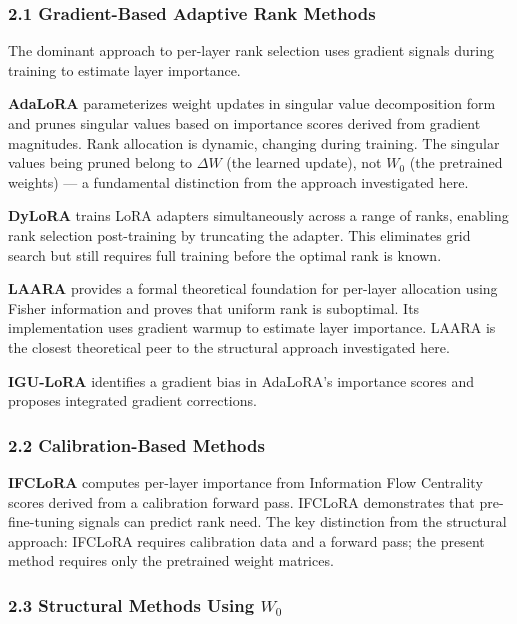 
\subsubsection{2.1 Gradient-Based Adaptive Rank Methods}

The dominant approach to per-layer rank selection uses gradient signals during training to estimate layer importance.

\textbf{AdaLoRA} \citep{Zhang2023AdaLoRA} parameterizes weight updates in singular value decomposition form and prunes singular values based on importance scores derived from gradient magnitudes. Rank allocation is dynamic, changing during training. The singular values being pruned belong to $\Delta W$ (the learned update), not $W_0$ (the pretrained weights) --- a fundamental distinction from the approach investigated here.

\textbf{DyLoRA} \citep{Valipour2022} trains LoRA adapters simultaneously across a range of ranks, enabling rank selection post-training by truncating the adapter. This eliminates grid search but still requires full training before the optimal rank is known.

\textbf{LAARA} \citep{Tripathi2026LAARA} provides a formal theoretical foundation for per-layer allocation using Fisher information and proves that uniform rank is suboptimal. Its implementation uses gradient warmup to estimate layer importance. LAARA is the closest theoretical peer to the structural approach investigated here.

\textbf{IGU-LoRA} \citep{Jiang2026IGULoRA} identifies a gradient bias in AdaLoRA's importance scores and proposes integrated gradient corrections.

\subsubsection{2.2 Calibration-Based Methods}

\textbf{IFCLoRA} \citep{Zhang2026IFCLoRA} computes per-layer importance from Information Flow Centrality scores derived from a calibration forward pass. IFCLoRA demonstrates that pre-fine-tuning signals can predict rank need. The key distinction from the structural approach: IFCLoRA requires calibration data and a forward pass; the present method requires only the pretrained weight matrices.

\subsubsection{2.3 Structural Methods Using $W_0$}

